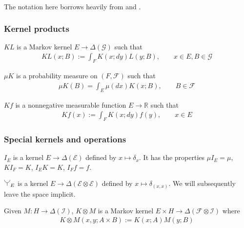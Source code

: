 The notation here borrows heavily from \cite{cinlar_probability_2011} and \cite{fong_causal_2013}.


\subsubsection{Kernel products}


$KL$ is a Markov kernel $E\to \Delta(\mathcal{G})$ such that
\begin{align}
    KL(x;B):= \int_F K(x;dy) L(y;B),\qquad x\in E, B\in \mathcal{G}
\end{align}

$\mu K$ is a probability measure on $(F,\mathcal{F})$ such that
\begin{align}
    \mu K(B)=\int_E \mu(dx) K(x;B),\qquad B\in\mathcal{F}
\end{align}

$Kf$ is a nonnegative measurable function $E\to \mathbb{R}$ such that
\begin{align}
    Kf(x) := \int_F K(x;dy)f(y), \qquad x\in E
\end{align}

\subsubsection{Special kernels and operations}



$I_E$ is a kernel $E\to \Delta(\mathcal{E})$ defined by $x\mapsto \delta_x$. It has the properties $\mu I_E=\mu$, $KI_F = K$, $I_E K = K$, $I_F f=f$.

$\splitter{0.15}_E$ is a kernel $E\to \Delta(\mathcal{E}\otimes\mathcal{E})$ defined by $x\mapsto \delta_{(x,x)}$. We will subsequently leave the space implicit.

Given $M:H\to \Delta(\mathcal{I})$, $K\otimes M$ is a Markov kernel $E\times H\to \Delta(\mathcal{F}\otimes\mathcal{I})$ where
\begin{align}
    K\otimes M(x,y;A\times B) := K(x;A) M(y;B)
\end{align}

